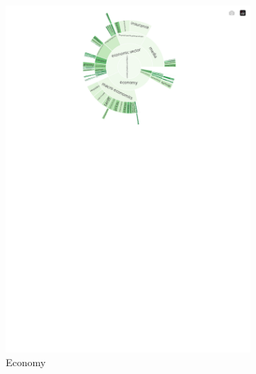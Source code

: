 \begin{figure}[!htbp]
\begin{subfigure}{0.45\textwidth}
		\includegraphics[trim={0 0 0 0},clip,width=\linewidth]{figures/baly_iptc_weighted_prop_leaning_corr_tfidf_zoom_economy.pdf}
		\caption{Economy}
            \label{fig:baly_iptc_weighted_prop_leaning_corr_tfidf_zoom_economy}
	\end{subfigure}
	\begin{subfigure}{0.45\textwidth}

\end{subfigure}
\end{figure}
